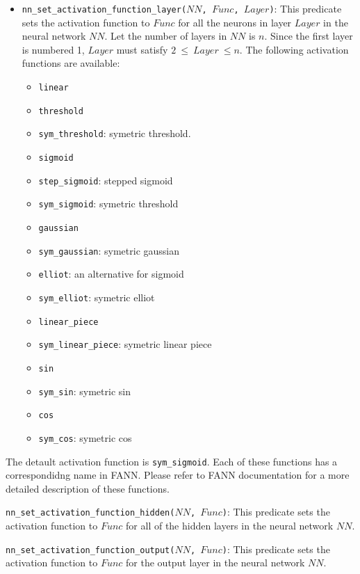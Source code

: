 \begin{itemize}
\item \texttt{nn\_set\_activation\_function\_layer($NN$, $Func$, $Layer$)}: This predicate sets the activation function to $Func$ for all the neurons in layer $Layer$ in the neural network $NN$. Let the number of layers in $NN$ is $n$. Since the first layer is numbered 1, $Layer$ must satisfy $2\ \le\ Layer\ \le n$. The following activation functions are available:
\begin{itemize}
\item \texttt{linear}
\item \texttt{threshold}
\item \texttt{sym\_threshold}: symetric threshold.
\item \texttt{sigmoid}
\item \texttt{step\_sigmoid}: stepped sigmoid
\item \texttt{sym\_sigmoid}: symetric threshold
\item \texttt{gaussian}
\item \texttt{sym\_gaussian}: symetric gaussian
\item \texttt{elliot}: an alternative for sigmoid
\item \texttt{sym\_elliot}: symetric elliot
\item \texttt{linear\_piece}
\item \texttt{sym\_linear\_piece}: symetric linear piece
\item \texttt{sin}
\item \texttt{sym\_sin}: symetric sin
\item \texttt{cos}
\item \texttt{sym\_cos}: symetric cos
\end{itemize}
\end{itemize}
The detault activation function is \texttt{sym\_sigmoid}. Each of these functions has a correspondidng name in FANN. Please refer to FANN documentation for a more detailed description of these functions.

\item \texttt{nn\_set\_activation\_function\_hidden($NN$, $Func$)}: This predicate sets the activation function to $Func$ for all of the hidden layers in the neural network $NN$.

\item \texttt{nn\_set\_activation\_function\_output($NN$, $Func$)}: This predicate sets the activation function to $Func$ for the output layer in the neural network $NN$.

